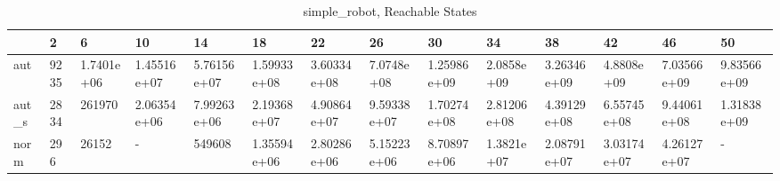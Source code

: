 \begin{table}
\caption{simple_robot, Reachable States}
\label{simple_robot_reach}
\begin{tabular}{llllllllllllll}
\toprule
 & 2 & 6 & 10 & 14 & 18 & 22 & 26 & 30 & 34 & 38 & 42 & 46 & 50 \\
\midrule
aut & 9235 & 1.7401e+06 & 1.45516e+07 & 5.76156e+07 & 1.59933e+08 & 3.60334e+08 & 7.0748e+08 & 1.25986e+09 & 2.0858e+09 & 3.26346e+09 & 4.8808e+09 & 7.03566e+09 & 9.83566e+09 \\
aut_s & 2834 & 261970 & 2.06354e+06 & 7.99263e+06 & 2.19368e+07 & 4.90864e+07 & 9.59338e+07 & 1.70274e+08 & 2.81206e+08 & 4.39129e+08 & 6.55745e+08 & 9.44061e+08 & 1.31838e+09 \\
norm & 296 & 26152 & - & 549608 & 1.35594e+06 & 2.80286e+06 & 5.15223e+06 & 8.70897e+06 & 1.3821e+07 & 2.08791e+07 & 3.03174e+07 & 4.26127e+07 & - \\
\bottomrule
\end{tabular}
\end{table}
